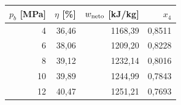 \begin{tabular}{rrrr}
\toprule
$p_b$ [MPa] & $\eta$ [\%] & $w_{\rm neto}$ [kJ/kg] & $x_4$\\
\midrule
4 & 36,46 & 1168,39 & 0,8511 \\
6 & 38,06 & 1209,20 & 0,8228 \\
8 & 39,12 & 1232,14 & 0,8016 \\
10 & 39,89 & 1244,99 & 0,7843 \\
12 & 40,47 & 1251,21 & 0,7693 \\
\bottomrule
\end{tabular}
